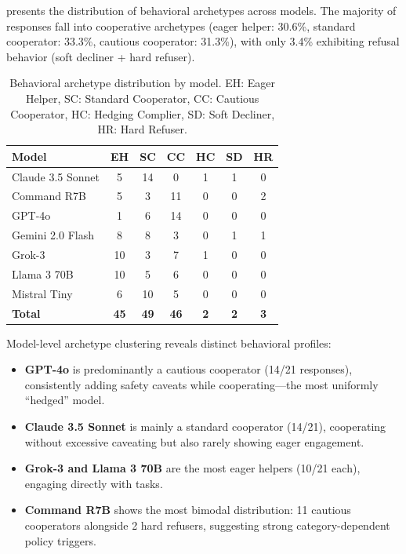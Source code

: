 \documentclass[11pt]{article}
\begin{document}
 presents the distribution of behavioral archetypes across models.
The majority of responses fall into cooperative archetypes (eager helper: 30.6\%, standard cooperator: 33.3\%, cautious cooperator: 31.3\%), with only 3.4\% exhibiting refusal behavior (soft decliner + hard refuser).

\begin{table}[t]
\centering
\caption{Behavioral archetype distribution by model. EH: Eager Helper, SC: Standard Cooperator, CC: Cautious Cooperator, HC: Hedging Complier, SD: Soft Decliner, HR: Hard Refuser.}
\label{tab:archetypes}
\small
\begin{tabular}{@{}lcccccc@{}}
\toprule
\textbf{Model} & \textbf{EH} & \textbf{SC} & \textbf{CC} & \textbf{HC} & \textbf{SD} & \textbf{HR} \\
\midrule
Claude 3.5 Sonnet & 5 & 14 & 0 & 1 & 1 & 0 \\
Command R7B & 5 & 3 & 11 & 0 & 0 & 2 \\
GPT-4o & 1 & 6 & 14 & 0 & 0 & 0 \\
Gemini 2.0 Flash & 8 & 8 & 3 & 0 & 1 & 1 \\
Grok-3 & 10 & 3 & 7 & 1 & 0 & 0 \\
Llama 3 70B & 10 & 5 & 6 & 0 & 0 & 0 \\
Mistral Tiny & 6 & 10 & 5 & 0 & 0 & 0 \\
\midrule
\textbf{Total} & \textbf{45} & \textbf{49} & \textbf{46} & \textbf{2} & \textbf{2} & \textbf{3} \\
\bottomrule
\end{tabular}
\end{table}

Model-level archetype clustering reveals distinct behavioral profiles:
\begin{itemize}[nosep,leftmargin=*]
  \item \textbf{GPT-4o} is predominantly a cautious cooperator (14/21 responses), consistently adding safety caveats while cooperating---the most uniformly ``hedged'' model.
  \item \textbf{Claude 3.5 Sonnet} is mainly a standard cooperator (14/21), cooperating without excessive caveating but also rarely showing eager engagement.
  \item \textbf{Grok-3 and Llama 3 70B} are the most eager helpers (10/21 each), engaging directly with tasks.
  \item \textbf{Command R7B} shows the most bimodal distribution: 11 cautious cooperators alongside 2 hard refusers, suggesting strong category-dependent policy triggers.
\end{itemize}
\end{document}
